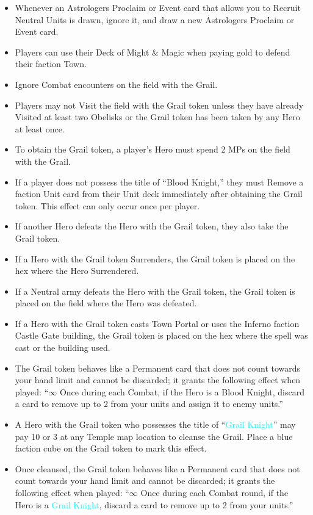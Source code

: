 \begin{multicols*}{2}
\begin{itemize}
    \item Whenever an Astrologers Proclaim or Event card that allows you to Recruit Neutral Units is drawn, ignore it, and draw a new Astrologers Proclaim or Event card.
    \item Players can use their Deck of Might \& Magic when paying gold to defend their faction Town.
    \item Ignore Combat encounters on the field with the Grail.
    \item Players may not Visit the field with the Grail token unless they have already Visited at least two Obelisks or the Grail token has been taken by any Hero at least once.
    \item To obtain the Grail token, a player’s Hero must spend 2 MPs on the field with the Grail.
    \item If a player does not possess the title of “\textcolor{darkcandyapplered}{Blood Knight},” they must Remove a faction Unit card from their Unit deck immediately after obtaining the Grail token. This effect can only occur once per player.
    \item If another Hero defeats the Hero with the Grail token, they also take the Grail token.
    \item If a Hero with the Grail token Surrenders, the Grail token is placed on the hex where the Hero Surrendered.
    \item If a Neutral army defeats the Hero with the Grail token, the Grail token is placed on the field where the Hero was defeated.
    \item If a Hero with the Grail token casts Town Portal or uses the Inferno faction Castle Gate building, the Grail token is placed on the hex where the spell was cast or the building used.
    \item The Grail token behaves like a Permanent card that does not count towards your hand limit and cannot be discarded; it grants the following effect when played: “$\infty$ Once during each Combat, if the Hero is a \textcolor{darkcandyapplered}{Blood Knight}, discard a card to remove up to 2  from your units and assign it to enemy units.”
    \item A Hero with the Grail token who possesses the title of “\textcolor{cyan}{Grail Knight}” may pay 10  or 3  at any Temple map location to cleanse the Grail. Place a blue faction cube on the Grail token to mark this effect.
    \item Once cleansed, the Grail token behaves like a Permanent card that does not count towards your hand limit and cannot be discarded; it grants the following effect when played: “$\infty$ Once during each Combat round, if the Hero is a \textcolor{cyan}{Grail Knight}, discard a card to remove up to 2  from your units.”
\end{itemize}

\end{multicols*}
